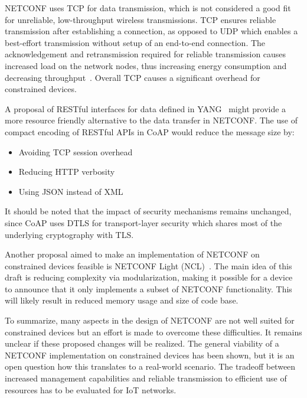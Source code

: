 \documentclass[conference]{IEEEtran}
\begin{document}
NETCONF uses TCP for data transmission, which is not considered a good fit for unreliable, low-throughput wireless transmissions. TCP ensures reliable transmission after establishing a connection, as opposed to UDP which enables a best-effort transmission without setup of an end-to-end connection. The acknowledgement and retransmission required for reliable transmission causes increased load on the network nodes, thus increasing energy consumption and decreasing throughput~\cite{Dunkels2003}. Overall TCP causes a significant overhead for constrained devices. 

A proposal of RESTful interfaces for data defined in YANG~\cite{Bierman} might provide a more resource friendly alternative to the data transfer in NETCONF. The use of compact encoding of RESTful APIs in CoAP would reduce the message size by:

\begin{itemize}
  \item Avoiding TCP session overhead
  \item Reducing HTTP verbosity
  \item Using JSON instead of XML
\end{itemize}

It should be noted that the impact of security mechanisms remains unchanged, since CoAP uses DTLS for transport-layer security which shares most of the underlying cryptography with TLS.

Another proposal aimed to make an implementation of NETCONF on constrained devices feasible is NETCONF Light (NCL)~\cite{Perelman}. The main idea of this draft is reducing complexity via modularization, making it possible for a device to announce that it only implements a subset of NETCONF functionality. This will likely result in reduced memory usage and size of code base.

To summarize, many aspects in the design of NETCONF are not well suited for constrained devices but an effort is made to overcome these difficulties. It remains unclear if these proposed changes will be realized. The general viability of a NETCONF implementation on constrained devices has been shown, but it is an open question how this translates to a real-world scenario. The tradeoff between increased management capabilities and reliable transmission to efficient use of resources has to be evaluated for IoT networks.


\end{document}

